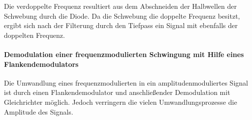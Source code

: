Die verdoppelte Frequenz resultiert aus dem Abschneiden
der Halbwellen der Schwebung durch die Diode.
Da die Schwebung die doppelte Frequenz besitzt, ergibt sich nach der Filterung
durch den Tiefpass ein Signal mit ebenfalls der doppelten Frequenz.
\paragraph{Demodulation einer frequenzmodulierten Schwingung
mit Hilfe eines Flankendemodulators}
Die Umwandlung eines frequenzmodulierten in ein
amplitudenmoduliertes Signal ist durch einen Flankendemodulator
und anschließender Demodulation mit Gleichrichter
möglich. Jedoch verringern die
vielen Umwandlungsprozesse die Amplitude des Signals.
